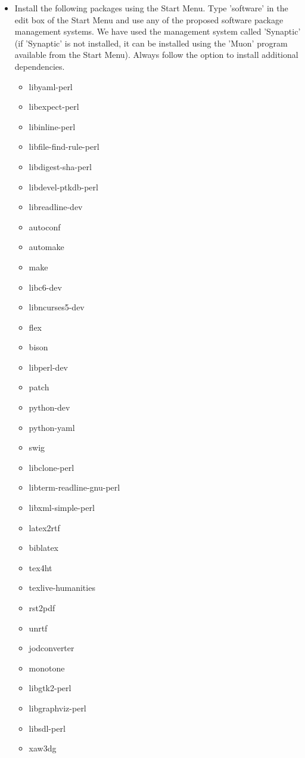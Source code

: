 \documentclass[12pt]{article}
\begin{document}
\begin{itemize}
\item[] Install the following packages using the Start Menu.  Type
  'software' in the edit box of the Start Menu and use any of the
  proposed software package management systems.  We have used the
  management system called 'Synaptic' (if 'Synaptic' is not installed,
  it can be installed using the 'Muon' program available from the
  Start Menu).  Always follow the option to install additional
  dependencies.
      \begin{itemize}
         \item libyaml-perl
         \item libexpect-perl
         \item libinline-perl
         \item libfile-find-rule-perl
         \item libdigest-sha-perl
         \item libdevel-ptkdb-perl
         \item libreadline-dev
         \item autoconf
         \item automake
         \item make
         \item libc6-dev
         \item libncurses5-dev
         \item flex
         \item bison
         \item libperl-dev
         \item patch
         \item python-dev
         \item python-yaml
         \item swig
         \item libclone-perl
         \item libterm-readline-gnu-perl
         \item libxml-simple-perl
         \item latex2rtf
         \item biblatex
         \item tex4ht
         \item texlive-humanities
         \item rst2pdf
         \item unrtf
         \item jodconverter
         \item monotone
         \item libgtk2-perl
         \item libgraphviz-perl
         \item libsdl-perl
         \item xaw3dg
      \end{itemize}
 \end{itemize}
\end{document}
